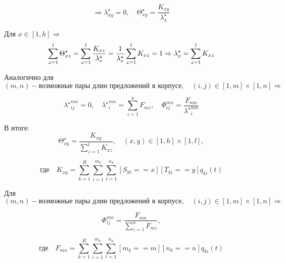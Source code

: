 \documentclass[10pt]{article}
\begin{document}
	$$ \Rightarrow \lambda_{xy}^{\star} = 0, \quad \Theta_{xy}^{\star} = \frac{K_{xy}} {\lambda_{x}^{\star}}
	$$
	
	Для $ x \in [1, h] \Rightarrow $
	$$ \sum_{z=1}^{l} \Theta_{xz}^{\star} = \sum_{z=1}^{l}  \frac{K_{xz}} {\lambda_{x}^{\star}} = 
	\frac{1} {\lambda_{x}^{\star}} \sum_{z=1}^{l} K_{xz} = 1\\
	\Rightarrow \lambda_{x}^{\star} = \sum_{z=1}^{l} K_{xz}
	$$
	
	Аналогично для $ (m, n) - \text{возможные пары длин предложений в корпусе}, \quad (i, j) \in [1, m] \times [1, n] \Rightarrow $
	
	$$ {\lambda^{\star}}_{ij}^{mn} = 0,
	\quad {\lambda^{\star}}_i^{mn} = \sum_{z=1}^n F_{mz},
	\quad \Phi_{ij}^{mn} = \frac{F_{mn}}{{\lambda^{\star}}_i^{mn}} $$
	
	В итоге:  
	$$ \Theta_{xy}^{\star} = \frac{K_{xy}} {\sum_{z=1}^{l} K_{xz}}, \quad (x, y) \in [1, h] \times [1, l],
	$$
	
	$$ \text{где} \quad K_{xy} =  \sum_{k=1}^R \sum_{i=1}^{m_k} \sum_{t=1}^{n_k} [S_{kt}==x][T_{ki} == y] q_{ki}(t)
	$$
	
	Для $ (m, n) - \text{возможные пары длин предложений в корпусе}, \quad (i, j) \in [1, m] \times [1, n] \Rightarrow $
	
	$$ \Phi_{ij}^{mn} = \frac{F_{mn}}{\sum_{z=1}^n F_{mz}},
	$$
	
	$$ \text{где} \quad F_{mn} = \sum_{k=1}^R \sum_{i=1}^{m_k} \sum_{t=1}^{n_k} [m_k==m][n_k==n] q_{ki}(t)
	$$
	
	
\end{document}
